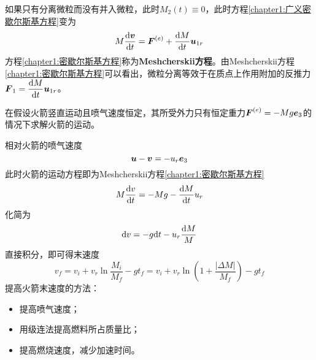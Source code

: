 如果只有分离微粒而没有并入微粒，此时$M_2(t)\equiv 0$，此时方程\eqref{chapter1:广义密歇尔斯基方程}变为
\begin{equation}
	M\dfrac{\mathrm{d} \boldsymbol{v}}{\mathrm{d} t} = \boldsymbol{F}^{(e)} + \dfrac{\mathrm{d} M}{\mathrm{d} t}\boldsymbol{u}_{1r}
	\label{chapter1:密歇尔斯基方程}
\end{equation}
方程\eqref{chapter1:密歇尔斯基方程}称为{\bf Meshcherskii方程}。由Meshcherskii方程\eqref{chapter1:密歇尔斯基方程}可以看出，微粒分离等效于在质点上作用附加的反推力$\boldsymbol{F}_1 = \dfrac{\mathrm{d} M}{\mathrm{d} t}\boldsymbol{u}_{1r}$。

\begin{example}[重力场中的火箭]
在假设火箭竖直运动且喷气速度恒定，其所受外力只有恒定重力$\boldsymbol{F}^{(e)} = -Mg\boldsymbol{e}_3$的情况下求解火箭的运动。
\end{example}
\begin{solution}
相对火箭的喷气速度
\begin{equation*}
	\boldsymbol{u}-\boldsymbol{v} = -u_r\boldsymbol{e}_3
\end{equation*}
此时火箭的运动方程即为Meshcherskii方程\eqref{chapter1:密歇尔斯基方程}
\begin{equation*}
	M\frac{\mathrm{d} v}{\mathrm{d} t} = -Mg - \dfrac{\mathrm{d} M}{\mathrm{d} t}u_r
\end{equation*}
化简为
\begin{equation*}
	\mathrm{d} v = -g\mathrm{d} t - u_r \frac{\mathrm{d} M}{M}
\end{equation*}
直接积分，即可得末速度
\begin{equation*}
	v_f = v_i + v_r \ln \frac{M_i}{M_f} - gt_f = v_i + v_r \ln \left(1+\frac{|\Delta M|}{M_f}\right) - gt_f
\end{equation*}
提高火箭末速度的方法：
\begin{itemize}
	\item 提高喷气速度；
	\item 用级连法提高燃料所占质量比；
	\item 提高燃烧速度，减少加速时间。
\end{itemize}
\end{solution}

